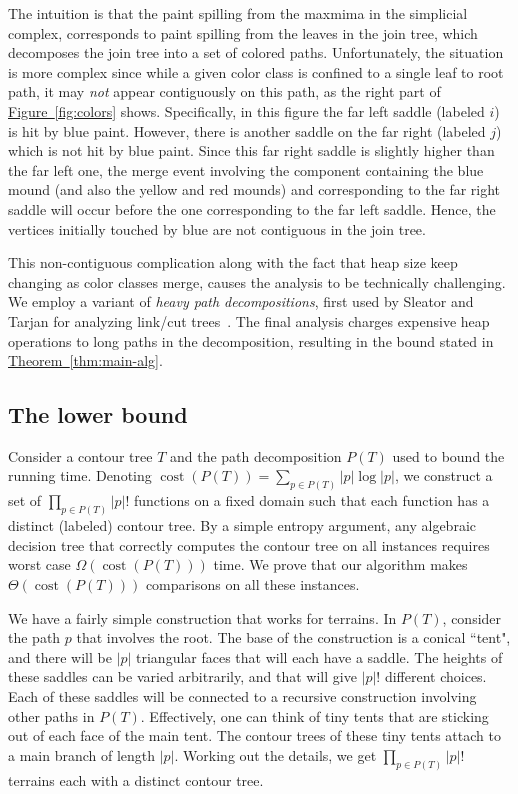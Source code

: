 \documentclass[11pt]{article}
\theoremstyle{definition}
\newcommand{\Fig}[1]{\hyperref[fig:#1]{Figure~\ref*{fig:#1}}} %
\newcommand{\Thm}[1]{\hyperref[thm:#1]{Theorem~\ref*{thm:#1}}} %
\newcommand{\cost}{\mathop{cost}}
\begin{document}
{The intuition is that the paint spilling from the maxmima in the simplicial complex, corresponds to paint spilling from the leaves in 
the join tree, which decomposes the join tree into a set of colored paths.  Unfortunately, the situation is more complex since 
while a given color class is confined to a single leaf to root path, it may \emph{not} appear contiguously on this path, as the right part of \Fig{colors} shows. 
Specifically, in this figure the far left saddle (labeled $i$) is hit by blue paint.  However, there is another 
saddle on the far right (labeled $j$) which is not hit by blue paint.  Since this far right saddle is slightly 
higher than the far left one, the merge event involving the component containing the blue mound (and also the yellow and red mounds) and corresponding to the far right saddle
will occur before the one corresponding to the far left saddle.  Hence, the vertices initially touched by blue are not contiguous in the join tree.

This non-contiguous complication along with the fact that heap size keep changing as color classes merge, causes the analysis to be technically challenging. 
We employ a variant of \emph{heavy path decompositions}, first used by Sleator and Tarjan for analyzing link/cut trees~\cite{st-dsdt-83}.
The final analysis charges expensive heap operations to long paths in the decomposition, resulting in the bound stated in \Thm{main-alg}.
 
\subsection{The lower bound} 

Consider a contour tree $T$ and the path decomposition $P(T)$ used to bound the running time. 
Denoting $\cost(P(T)) = \sum_{p \in P(T)} |p|\log |p|$, we construct a set of $\prod_{p \in P(T)} |p|!$
functions on a fixed domain such that each function has a distinct (labeled) contour tree. By a simple
entropy argument, any algebraic decision tree that correctly computes the contour tree on all instances
requires worst case $\Omega(\cost(P(T)))$ time. We prove that our algorithm makes $\Theta(\cost(P(T)))$ 
comparisons on all these instances. 

We have a fairly simple construction that works for terrains. In $P(T)$, consider the path
$p$ that involves the root. The base of the construction is a conical ``tent", and there
will be $|p|$ triangular faces that will each have a saddle. The heights of these saddles
can be varied arbitrarily, and that will give $|p|!$ different choices. Each of these saddles
will be connected to a recursive construction involving other paths in $P(T)$. Effectively,
one can think of tiny tents that are sticking out of each face of the main tent. The contour
trees of these tiny tents attach to a main branch of length $|p|$. Working out the details,
we get $\prod_{p \in P(T)} |p|!$ terrains each with a distinct contour tree. 
}
\end{document}
